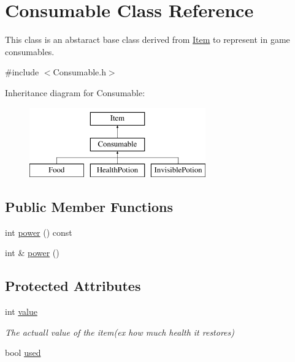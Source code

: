 \hypertarget{classConsumable}{\section{Consumable Class Reference}
\label{classConsumable}
}


This class is an abstaract base class derived from \hyperlink{classItem}{Item} to represent in game consumables.  




{\ttfamily \#include $<$Consumable.\-h$>$}

Inheritance diagram for Consumable\-:\begin{figure}[H]
\begin{center}
\leavevmode
\includegraphics[height=3.000000cm]{classConsumable}
\end{center}
\end{figure}
\subsection*{Public Member Functions}
\begin{DoxyCompactItemize}
\item 
int \hyperlink{classConsumable_a043c6f13f4e3eb5121f2e8c85bf8b0da}{power} () const 
\item 
int \& \hyperlink{classConsumable_a1f0a7dee6c685c9b3d003d735877981b}{power} ()
\end{DoxyCompactItemize}
\subsection*{Protected Attributes}
\begin{DoxyCompactItemize}
\item 
int \hyperlink{classConsumable_a492024e0b8fd5b6c6e944116cbff3e32}{value}
\begin{DoxyCompactList}\small\item\em The actuall value of the item(ex how much health it restores) \end{DoxyCompactList}\item 
bool \hyperlink{classConsumable_a261f0f34c301027337ffe6bf32bf0200}{used}
\end{DoxyCompactItemize}
